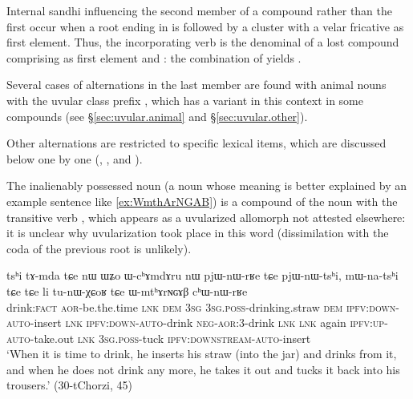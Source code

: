 Internal sandhi influencing the second member of a compound rather than the first occur when a root ending in  is followed by a cluster with a velar fricative as first element. Thus, the incorporating verb  is the denominal of a lost compound  comprising  as first element and : the combination of  yields .

Several cases of alternations in the last member are found with animal nouns with the uvular class prefix , which has a variant  in this context in some compounds (see §\ref{sec:uvular.animal} and §\ref{sec:uvular.other}). 

Other alternations are restricted to specific lexical items, which are discussed below one by one (, ,  and ).

The inalienably possessed noun  (a noun whose meaning is better explained by an example sentence like \ref{ex:WmthArNGAB}) is a compound of the noun  with the transitive verb , which appears as a uvularized allomorph  not attested elsewhere: it is unclear why uvularization took place in this word (dissimilation with the coda  of the previous root is unlikely).

\begin{exe}
\ex \label{ex:WmthArNGAB}
\gll tsʰi tɤ-mda tɕe nɯ ɯʑo ɯ-cʰɤmdɤru nɯ pjɯ-nɯ-rʁe tɕe pjɯ-nɯ-tsʰi, mɯ-na-tsʰi tɕe tɕe li tu-nɯ-χɕoʁ tɕe ɯ-mtʰɤrɴɢɤβ cʰɯ-nɯ-rʁe \\
drink:\textsc{fact} \textsc{aor}-be.the.time \textsc{lnk} \textsc{dem} \textsc{3sg} \textsc{3sg}.\textsc{poss}-drinking.straw \textsc{dem} \textsc{ipfv}:\textsc{down}-\textsc{auto}-insert \textsc{lnk} \textsc{ipfv}:\textsc{down}-\textsc{auto}-drink \textsc{neg}-\textsc{aor}:3\flobv{}-drink \textsc{lnk} \textsc{lnk} again \textsc{ipfv}:\textsc{up}-\textsc{auto}-take.out \textsc{lnk} \textsc{3sg}.\textsc{poss}-tuck \textsc{ipfv}:\textsc{downstream}-\textsc{auto}-insert \\
\glt `When it is time to drink, he inserts his straw (into the jar) and drinks from it, and when he does not drink any more, he takes it out and tucks it back into his trousers.' (30-tChorzi, 45)
\end{exe}
 
